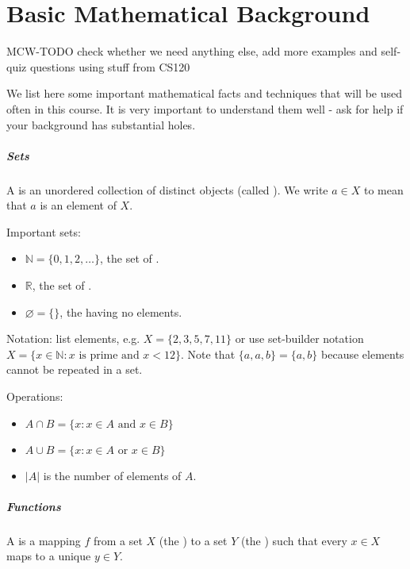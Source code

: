 \setcounter{chapter}{-1}
\chapter{Basic Mathematical Background}
\label{ch:app:mathtools}

MCW-TODO check whether we need anything else, add more examples and self-quiz questions using stuff from CS120

We list here some important mathematical facts and techniques  that will be used often in this course. It is very important to understand them well - ask for help if your background has substantial holes.

\paragraph{Sets}

A  is an unordered collection of distinct objects (called ). We write $a\in X$ to mean that $a$ is an element of $X$.

Important sets: 
\begin{itemize}
\item $\mathbb{N} = \{0,1,2,\dots \}$, the set of .
\item $\mathbb{R}$, the set of .
\item $\varnothing = \{\}$, the  having no elements.
\end{itemize}

Notation: list elements, e.g. $X = \{2,3,5,7,11\}$ or use set-builder notation $X = \{x\in \mathbb{N} : \text{$x$ is prime and $x< 12$}\}$. Note that $\{a, a, b\} = \{a, b\}$ because elements cannot be repeated in a set.

Operations: 
\begin{itemize}
\item $A\cap B = \{x: x\in A \text{ and } x\in B\}$
\item $A\cup B = \{x: x\in A \text{ or  } x\in B\}$
\item $|A|$ is the number of elements of $A$.
\end{itemize}


\paragraph{Functions}

A  is a mapping $f$ from a set $X$ (the ) to a set $Y$ (the ) such that every $x\in X$ maps to a unique $y\in Y$.

